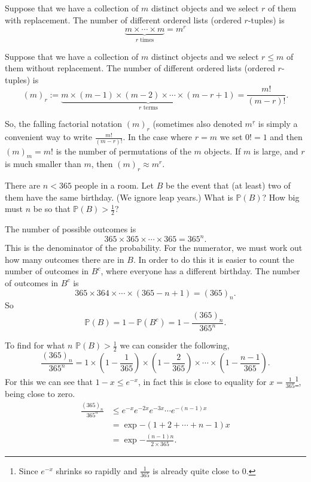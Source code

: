 \documentclass[10pt, a4paper]{article}
\begin{document}
\begin{countprinc}
    Suppose that we have a collection of $m$ distinct objects and we select $r$ of them with replacement. The number of different ordered lists (ordered $r$-tuples) is
    \[
    \underbrace{m \times \dotsi \times m}_{r \text{ times}} = m ^ r
    \]
\end{countprinc}

\begin{countprinc}
    Suppose that we have a collection of $m$ distinct objects and we select $r \leq m$ of them without replacement. The number of different ordered lists (ordered $r$-tuples) is
    \[
    (m)_r := \underbrace{m \times (m - 1) \times (m - 2) \times \dotsi \times (m - r + 1)}_{r \text{ terms}} = \frac{m!}{(m - r)!}.
    \]
\end{countprinc}
So, the falling factorial notation $(m)_r$ (sometimes also denoted $m ^ {\underline{r}}$ is simply a convenient way to write $\frac{m!}{(m - r)!}$. In the case where $r = m$ we set $0! = 1$ and then $(m)_m = m!$ is the number of permutations of the $m$ objects. If $m$ is large, and $r$ is much smaller than $m$, then $(m)_r \approx m ^ r$.

\begin{example}
    There are $n < 365$ people in a room. Let $B$ be the event that (at least) two of them have the same birthday. (We ignore leap years.) What is $\mathbb{P}(B)$? How big must $n$ be so that $\mathbb{P}(B) > \frac{1}{2}$?

    The number of possible outcomes is
    \[
    365 \times 365 \times \dotsi \times 365 = 365 ^ n.
    \]
    This is the denominator of the probability. For the numerator, we must work out how many outcomes there are in $B$. In order to do this it is easier to count the number of outcomes in $B ^ c$, where everyone has a different birthday. The number of outcomes in $B ^ c$ is
    \[
    365 \times 364 \times \dotsi \times (365 - n + 1) = (365)_n.
    \]
    So
    \[
    \mathbb{P}(B) = 1 - \mathbb{P}(B ^ c) = 1 - \frac{(365)_n}{365 ^ n}.
    \]

    To find for what $n$ $\mathbb{P}(B) > \frac{1}{2}$ we can consider the following,
    \[
    \frac{(365)_n}{365 ^ n} = 1 \times \left(1 - \frac{1}{365}\right) \times \left(1 - \frac{2}{365}\right) \times \dotsi \times \left(1 - \frac{n - 1}{365}\right).
    \]
    For this we can see that $1 - x \leq e ^ {-x}$, in fact this is close to equality for $x = \frac{1}{365}$\footnote{Since $e^{-x}$ shrinks so rapidly and $\frac{1}{365}$ is already quite close to $0$.}, being close to zero.
    \begin{align*}
        \frac{(365)_n}{365 ^ n} &\leq e ^ {-x} e ^ {-2x} e ^ {-3x} \dotsi e^{-(n - 1)x} \\
        &= \exp{-(1 + 2 + \dotsi + n - 1)x} \\
        &= \exp{-\frac{(n - 1)n}{2 \times 365}}.
    \end{align*}
\end{example}
\end{document}
